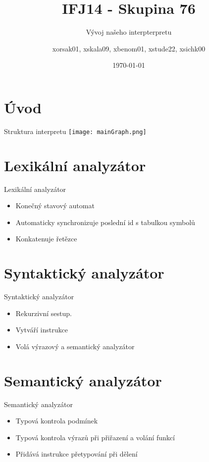 \documentclass{beamer}
\title{ IFJ14 - Skupina 76 }
\subtitle{Vývoj našeho interpterpretu}
\author{xorsak01, xskala09, xbenom01, xstude22, xsichk00 }
\institute[VUTBR]
{
{\Large Vysoké učení technické v Brně}\\
{\large Fakulta informačních technologií}
}
\date{\today}
\newenvironment{fitbox}[1]
  {\begin{beamerboxesrounded}[upper=upper,shadow=true]
  {#1}}
  {\end{beamerboxesrounded}}
\begin{document}
\begin{frame}
\titlepage
\end{frame}

\section{Úvod}
\begin{frame}
\begin{fitbox}{Struktura interpretu}
	\texttt{[image: mainGraph.png]}
\end{fitbox}
\end{frame}


\section{Lexikální analyzátor}
\begin{frame}
\begin{fitbox}{Lexikální analyzátor}
\begin{itemize}
	\item Konečný stavový automat
	\item Automaticky synchronizuje poslední id s tabulkou symbolů
	\item Konkatenuje řetězce
\end{itemize}
\end{fitbox}
\end{frame}


\section{Syntaktický analyzátor}
\begin{frame}
\begin{fitbox}{Syntaktický analyzátor}
\begin{itemize}
	\item Rekurzivní sestup.
	\item Vytváří instrukce
	\item Volá výrazový a semantický analyzátor 
\end{itemize}
\end{fitbox}

\end{frame}

\section{Semantický analyzátor}
\begin{frame}
\begin{fitbox}{Semantický analyzátor}
\begin{itemize}
	\item Typová kontrola podmínek
	\item Typová kontrola výrazů při přiřazení a volání funkcí
	\item Přidává instrukce přetypování při dělení
\end{itemize}
\end{fitbox}
\end{frame}
\end{document}

